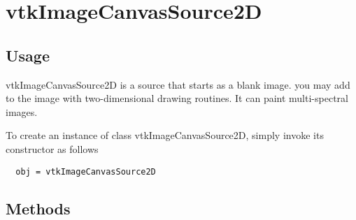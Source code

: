 \section{vtkImageCanvasSource2D}

\subsection{Usage}

 vtkImageCanvasSource2D is a source that starts as a blank image.
 you may add to the image with two-dimensional drawing routines.
 It can paint multi-spectral images.

To create an instance of class vtkImageCanvasSource2D, simply
invoke its constructor as follows
\begin{verbatim}
  obj = vtkImageCanvasSource2D
\end{verbatim}
\subsection{Methods}

